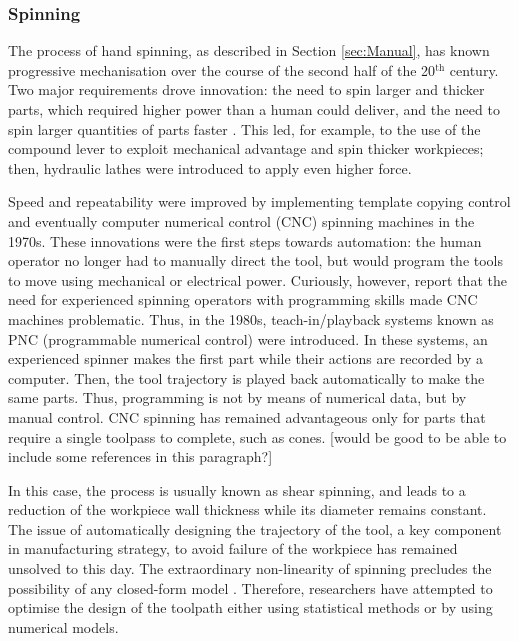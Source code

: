 \subsubsection*{Spinning}

The process of hand spinning, as described in Section \ref{sec:Manual}, has known progressive mechanisation over the course of the second half of the 20$^{\text{th}}$ century. Two major requirements drove innovation: the need to spin larger and thicker parts, which required higher power than a human could deliver, and the need to spin larger quantities of parts faster \citep{Wong2003AProcesses}. This led, for example, to the use of the compound lever to exploit mechanical advantage and spin thicker workpieces; then, hydraulic lathes were introduced to apply even higher force. 

Speed and repeatability were improved by implementing template copying control and eventually computer numerical control (CNC) spinning machines in the 1970s. These innovations were the first steps towards automation: the human operator no longer had to manually direct the tool, but would program the tools to move using mechanical or electrical power. Curiously, however, \citet{Wong2003AProcesses} report that the need for experienced spinning operators with programming skills made CNC machines problematic. Thus, in the 1980s, teach-in/playback systems known as PNC (programmable numerical control) were introduced. In these systems, an experienced spinner makes the first part while their actions are recorded by a computer. Then, the tool trajectory is played back automatically to make the same parts. Thus, programming is not by means of numerical data, but by manual control. CNC spinning has remained advantageous only for parts that require a single toolpass to complete, such as cones. [would be good to be able to include some references in this paragraph?]

In this case, the process is usually known as shear spinning, and leads to a reduction of the workpiece wall thickness while its diameter remains constant. The issue of automatically designing the trajectory of the tool, a key component in manufacturing strategy, to avoid failure of the workpiece has remained unsolved to this day. The extraordinary non-linearity of spinning precludes the possibility of any closed-form model \citep{Music2010ASpinning}. Therefore, researchers have attempted to optimise the design of the toolpath either using statistical methods or by using numerical models. 

